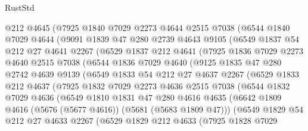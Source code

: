 \begin{lexlean}{RustStd}
\begin{coremodule}
      @212
      @4645
      (@7925
        @1840
        @7029
        @2273
        @4644
        @2515
        @7038
        (@6544
          @1840
          @7029
          @4644
          (@9091
            @1839
            @47
            @280
            @2739
            @4643
            @9105
            (@6549
              @1837
              @54
              @212
              @27
              @4641
              @2267
              (@6529
                @1837
                @212
                @4641
                (@7925
                  @1836
                  @7029
                  @2273
                  @4640
                  @2515
                  @7038
                  (@6544
                    @1836
                    @7029
                    @4640
                    (@9125
                      @1835
                      @47
                      @280
                      @2742
                      @4639
                      @9139
                      (@6549
                        @1833
                        @54
                        @212
                        @27
                        @4637
                        @2267
                        (@6529
                          @1833
                          @212
                          @4637
                          (@7925
                            @1832
                            @7029
                            @2273
                            @4636
                            @2515
                            @7038
                            (@6544
                              @1832
                              @7029
                              @4636
                              (@6549
                                @1810
                                @1831
                                @47
                                @280
                                @4616
                                @4635
                                (@6642 @1809 @4616 (@5676 (@5677 @4616)) (@5681 (@5683 @1809 @47)))
                                (@6549
                                  @1829
                                  @54
                                  @212
                                  @27
                                  @4633
                                  @2267
                                  (@6529
                                    @1829
                                    @212
                                    @4633
                                    (@7925
                                      @1828
                                      @7029

\end{coremodule}
\end{lexlean}
